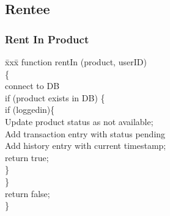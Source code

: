 \documentclass[11pt]{report}
\begin{document}
\begin{figure}[h]
\subsection{Rentee}
\subsubsection{Rent In Product}
\begin{tabbing}
\= xxx\= \kill
function rentIn (product, userID)\\
\{\\
\hspace{0.3in}connect to DB\\
\hspace{0.3in}if (product exists in DB) \{\\
 \hspace{0.6in}if (loggedin)\{\\ 
\hspace{1.2in}Update product status as not available;\\
\hspace{1.2in}Add transaction entry with status pending\\
\hspace{1.2in}Add history entry with current timestamp;\\
\hspace{1.2in}return true;\\
\hspace{0.6in} \}\\
\hspace{0.3in} \}\\
\hspace{0.3in}return false;\\
\}
\end{tabbing}

\end{figure}
\end{document}
